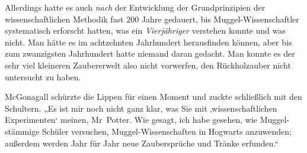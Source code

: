Allerdings hatte es auch \emph{nach} der Entwicklung der Grundprinzipien der wissenschaftlichen Methodik fast 200 Jahre gedauert, bis Muggel-Wissenschaftler systematisch erforscht hatten, was ein \emph{Vierjähriger} verstehen konnte und was nicht. Man hätte es im achtzehnten Jahrhundert herausfinden können, aber bis zum zwanzigsten Jahrhundert hatte niemand daran gedacht. Man konnte es der sehr viel kleineren Zaubererwelt also nicht vorwerfen, den Rückholzauber nicht untersucht zu haben.

McGonagall schürzte die Lippen für einen Moment und zuckte schließlich mit den Schultern. „Es ist mir noch nicht ganz klar, was Sie mit ‚wissenschaftlichen Experimenten‘ meinen, Mr~Potter. Wie gesagt, ich habe gesehen, wie Muggel-stämmige Schüler versuchen, Muggel-Wissenschaften in Hogwarts anzuwenden; außerdem werden Jahr für Jahr neue Zaubersprüche und Tränke erfunden.“

